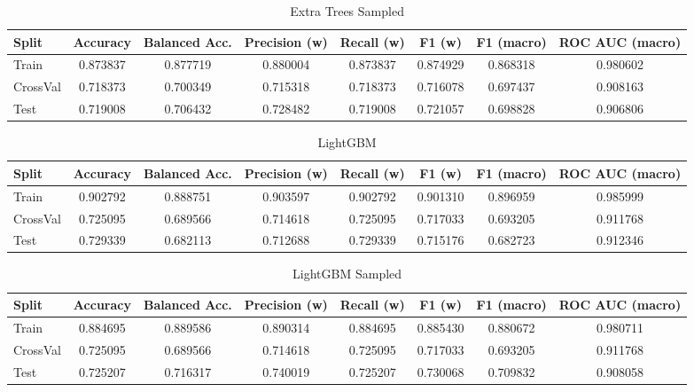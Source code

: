 \begin{table}[H]
	\centering
	\caption{Extra Trees Sampled}
	\begin{adjustbox}{max width=\textwidth}
		\begin{tabular}{lccccccc}
			\toprule
			Split & Accuracy & Balanced Acc. & Precision (w) & Recall (w) & F1 (w) & F1 (macro) & ROC AUC (macro) \\
			\midrule
			Train & 0.873837 & 0.877719 & 0.880004 & 0.873837 & 0.874929 & 0.868318 & 0.980602 \\
			CrossVal & 0.718373 & 0.700349 & 0.715318 & 0.718373 & 0.716078 & 0.697437 & 0.908163 \\
			Test & 0.719008 & 0.706432 & 0.728482 & 0.719008 & 0.721057 & 0.698828 & 0.906806 \\
			\bottomrule
		\end{tabular}
	\end{adjustbox}
\end{table}

\begin{table}[H]
	\centering
	\caption{LightGBM}
	\begin{adjustbox}{max width=\textwidth}
		\begin{tabular}{lccccccc}
			\toprule
			Split & Accuracy & Balanced Acc. & Precision (w) & Recall (w) & F1 (w) & F1 (macro) & ROC AUC (macro) \\
			\midrule
			Train & 0.902792 & 0.888751 & 0.903597 & 0.902792 & 0.901310 & 0.896959 & 0.985999 \\
			CrossVal & 0.725095 & 0.689566 & 0.714618 & 0.725095 & 0.717033 & 0.693205 & 0.911768 \\
			Test & 0.729339 & 0.682113 & 0.712688 & 0.729339 & 0.715176 & 0.682723 & 0.912346 \\
			\bottomrule
		\end{tabular}
	\end{adjustbox}
\end{table}

\begin{table}[H]
	\centering
	\caption{LightGBM Sampled}
	\begin{adjustbox}{max width=\textwidth}
		\begin{tabular}{lccccccc}
			\toprule
			Split & Accuracy & Balanced Acc. & Precision (w) & Recall (w) & F1 (w) & F1 (macro) & ROC AUC (macro) \\
			\midrule
			Train & 0.884695 & 0.889586 & 0.890314 & 0.884695 & 0.885430 & 0.880672 & 0.980711 \\
			CrossVal & 0.725095 & 0.689566 & 0.714618 & 0.725095 & 0.717033 & 0.693205 & 0.911768 \\
			Test & 0.725207 & 0.716317 & 0.740019 & 0.725207 & 0.730068 & 0.709832 & 0.908058 \\
			\bottomrule
		\end{tabular}
	\end{adjustbox}
\end{table}

